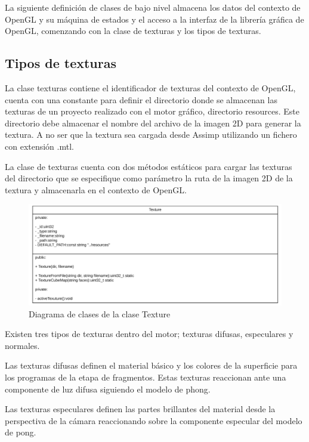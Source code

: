 \documentclass[a4paper, 17pt]{book}
\begin{document}
La siguiente definición de clases de bajo nivel almacena los datos del contexto de OpenGL y su máquina de estados y el acceso a la
interfaz de la librería gráfica de OpenGL, comenzando con la clase de texturas y los tipos de texturas.

\subsection{Tipos de texturas}
\label{subsec:Texturas}

La clase texturas contiene el identificador de texturas del contexto de OpenGL, cuenta con una constante para definir el directorio
donde se almacenan las texturas de un proyecto realizado con el motor gráfico, directorio resources. Este directorio debe almacenar el
nombre del archivo de la imagen 2D para generar la textura. A no ser que la textura sea cargada desde Assimp utilizando un fichero
con extensión .mtl.

La clase de texturas cuenta con dos métodos estáticos para cargar las texturas del directorio que se especifique como parámetro la ruta
de la imagen 2D de la textura y almacenarla en el contexto de OpenGL. 

\begin{figure}[hbt!]
    \centering
    \includegraphics[scale=0.25, keepaspectratio]{img/Texture.png}
    \caption{Diagrama de clases de la clase Texture}
    \label{figura:Texture}
\end{figure}

Existen tres tipos de texturas dentro del motor; texturas difusas, especulares y normales.

Las texturas difusas definen el material básico y los colores de la superficie para los programas de la etapa de fragmentos. Estas
texturas reaccionan ante una componente de luz difusa siguiendo el modelo de phong.

Las texturas especulares definen las partes brillantes del material desde la perspectiva de la cámara reaccionando sobre la componente
especular del modelo de pong.
\end{document}
